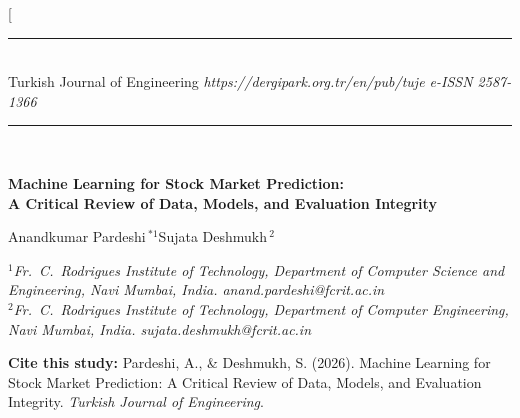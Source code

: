 \documentclass[10pt,a4paper,twocolumn]{article}
\begin{document}
\twocolumn[{%
\centering
\rule{\textwidth}{0.4pt}\\[2pt]
{\small Turkish Journal of Engineering \textbar{} \itshape https://dergipark.org.tr/en/pub/tuje \textbar{} \upshape e-ISSN 2587-1366}\\[1pt]
\rule{\textwidth}{0.4pt}\\[12pt]

{\LARGE\bfseries Machine Learning for Stock Market Prediction:\\[3pt]
A Critical Review of Data, Models, and Evaluation Integrity\par}
\vspace{12pt}

{\large Anandkumar Pardeshi\,$^{*1}$\quad Sujata Deshmukh\,$^{2}$\par}
\vspace{8pt}

{\footnotesize\itshape
$^{1}$Fr.\ C.\ Rodrigues Institute of Technology, Department of Computer Science and Engineering, Navi Mumbai, India. anand.pardeshi@fcrit.ac.in\\[1pt]
$^{2}$Fr.\ C.\ Rodrigues Institute of Technology, Department of Computer Engineering, Navi Mumbai, India. sujata.deshmukh@fcrit.ac.in\par}
\vspace{8pt}

\begin{minipage}{0.95\textwidth}
\footnotesize
\textbf{Cite this study:} Pardeshi, A., \& Deshmukh, S. (2026). Machine Learning for Stock Market Prediction: A Critical Review of Data, Models, and Evaluation Integrity. \textit{Turkish Journal of Engineering}.
\end{minipage}
\vspace{12pt}

}
\end{document}
